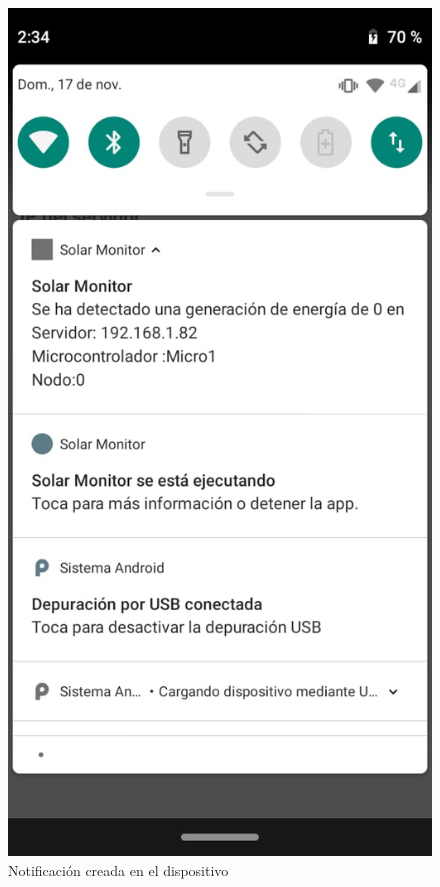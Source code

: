 \begin{figure}[H]
	\centering
	\includegraphics[scale=.4]{Capitulo4/software/submodulos/images/muestra02.jpg}
	\caption{Notificación creada en el dispositivo}	
	\label{fig:muestra 13}
\end{figure} 

